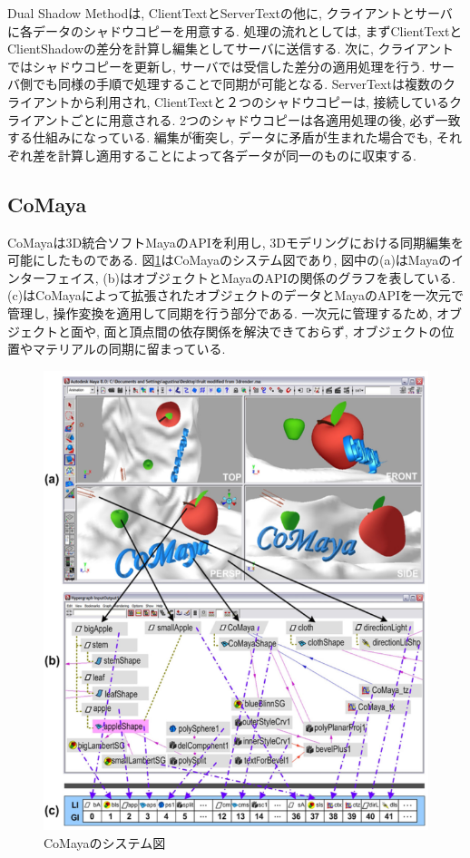 Dual Shadow Methodは, ClientTextとServerTextの他に, クライアントとサーバに各データのシャドウコピーを用意する. 処理の流れとしては, まずClientTextとClientShadowの差分を計算し編集としてサーバに送信する. 次に, クライアントではシャドウコピーを更新し, サーバでは受信した差分の適用処理を行う. サーバ側でも同様の手順で処理することで同期が可能となる. ServerTextは複数のクライアントから利用され, ClientTextと２つのシャドウコピーは, 接続しているクライアントごとに用意される. 2つのシャドウコピーは各適用処理の後, 必ず一致する仕組みになっている. 編集が衝突し, データに矛盾が生まれた場合でも, それぞれ差を計算し適用することによって各データが同一のものに収束する.
%
\subsection{CoMaya}
CoMayaは3D統合ソフトMayaのAPIを利用し, 3Dモデリングにおける同期編集を可能にしたものである.
図\ref{comayapng}はCoMayaのシステム図であり, 図中の(a)はMayaのインターフェイス, (b)はオブジェクトとMayaのAPIの関係のグラフを表している. (c)はCoMayaによって拡張されたオブジェクトのデータとMayaのAPIを一次元で管理し, 操作変換を適用して同期を行う部分である.
一次元に管理するため, オブジェクトと面や, 面と頂点間の依存関係を解決できておらず, オブジェクトの位置やマテリアルの同期に留まっている.
\begin{figure}[]
  \begin{center}
    \includegraphics[scale=0.6]{images/comaya}
    \caption{CoMayaのシステム図\cite{COMAYA}}
    \label{comayapng}
  \end{center}
\end{figure}
%
